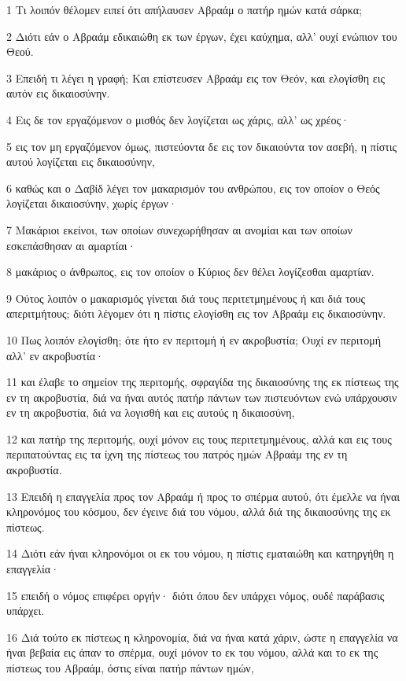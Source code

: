 \par 1 Τι λοιπόν θέλομεν ειπεί ότι απήλαυσεν Αβραάμ ο πατήρ ημών κατά σάρκα;
\par 2 Διότι εάν ο Αβραάμ εδικαιώθη εκ των έργων, έχει καύχημα, αλλ' ουχί ενώπιον του Θεού.
\par 3 Επειδή τι λέγει η γραφή; Και επίστευσεν Αβραάμ εις τον Θεόν, και ελογίσθη εις αυτόν εις δικαιοσύνην.
\par 4 Εις δε τον εργαζόμενον ο μισθός δεν λογίζεται ως χάρις, αλλ' ως χρέος·
\par 5 εις τον μη εργαζόμενον όμως, πιστεύοντα δε εις τον δικαιούντα τον ασεβή, η πίστις αυτού λογίζεται εις δικαιοσύνην,
\par 6 καθώς και ο Δαβίδ λέγει τον μακαρισμόν του ανθρώπου, εις τον οποίον ο Θεός λογίζεται δικαιοσύνην, χωρίς έργων·
\par 7 Μακάριοι εκείνοι, των οποίων συνεχωρήθησαν αι ανομίαι και των οποίων εσκεπάσθησαν αι αμαρτίαι·
\par 8 μακάριος ο άνθρωπος, εις τον οποίον ο Κύριος δεν θέλει λογίζεσθαι αμαρτίαν.
\par 9 Ούτος λοιπόν ο μακαρισμός γίνεται διά τους περιτετμημένους ή και διά τους απεριτμήτους; διότι λέγομεν ότι η πίστις ελογίσθη εις τον Αβραάμ εις δικαιοσύνην.
\par 10 Πως λοιπόν ελογίσθη; ότε ήτο εν περιτομή ή εν ακροβυστία; Ουχί εν περιτομή αλλ' εν ακροβυστία·
\par 11 και έλαβε το σημείον της περιτομής, σφραγίδα της δικαιοσύνης της εκ πίστεως της εν τη ακροβυστία, διά να ήναι αυτός πατήρ πάντων των πιστευόντων ενώ υπάρχουσιν εν τη ακροβυστία, διά να λογισθή και εις αυτούς η δικαιοσύνη,
\par 12 και πατήρ της περιτομής, ουχί μόνον εις τους περιτετμημένους, αλλά και εις τους περιπατούντας εις τα ίχνη της πίστεως του πατρός ημών Αβραάμ της εν τη ακροβυστία.
\par 13 Επειδή η επαγγελία προς τον Αβραάμ ή προς το σπέρμα αυτού, ότι έμελλε να ήναι κληρονόμος του κόσμου, δεν έγεινε διά του νόμου, αλλά διά της δικαιοσύνης της εκ πίστεως.
\par 14 Διότι εάν ήναι κληρονόμοι οι εκ του νόμου, η πίστις εματαιώθη και κατηργήθη η επαγγελία·
\par 15 επειδή ο νόμος επιφέρει οργήν· διότι όπου δεν υπάρχει νόμος, ουδέ παράβασις υπάρχει.
\par 16 Διά τούτο εκ πίστεως η κληρονομία, διά να ήναι κατά χάριν, ώστε η επαγγελία να ήναι βεβαία εις άπαν το σπέρμα, ουχί μόνον το εκ του νόμου, αλλά και το εκ της πίστεως του Αβραάμ, όστις είναι πατήρ πάντων ημών,
